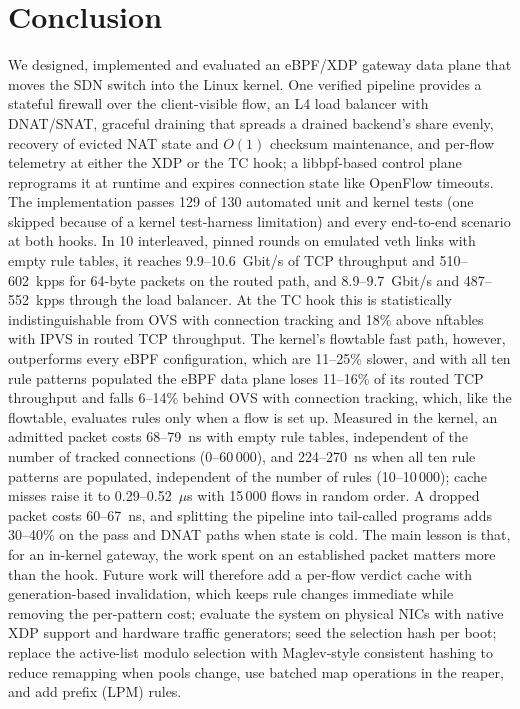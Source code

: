 \documentclass[conference]{IEEEtran}
\begin{document}
\section{Conclusion}
We designed, implemented and evaluated an eBPF/XDP gateway data plane that
moves the SDN switch into the Linux kernel. One verified pipeline provides a
stateful firewall over the client-visible flow, an L4 load balancer with
DNAT/SNAT, graceful draining that spreads a drained backend's share evenly,
recovery of evicted NAT state and $O(1)$ checksum maintenance, and per-flow
telemetry at either the XDP or the TC hook; a libbpf-based control plane
reprograms it at runtime and expires connection state like OpenFlow
timeouts. The implementation passes 129 of 130 automated unit and kernel
tests (one skipped because of a kernel test-harness limitation) and every
end-to-end scenario at both hooks. In 10 interleaved, pinned rounds on
emulated veth links with empty rule tables, it reaches 9.9--10.6~Gbit/s of
TCP throughput and 510--602~kpps for 64-byte packets on the routed path, and
8.9--9.7~Gbit/s and 487--552~kpps through the load balancer. At the TC hook
this is statistically indistinguishable from OVS with connection tracking
and 18\% above nftables with IPVS in routed TCP throughput. The kernel's
flowtable fast path, however, outperforms every eBPF configuration, which
are 11--25\% slower, and with all ten rule patterns populated the eBPF data plane
loses 11--16\% of its routed TCP throughput and falls 6--14\% behind OVS with
connection tracking, which, like the flowtable, evaluates rules only when a
flow is set up. Measured in the kernel, an admitted packet costs 68--79~ns
with empty rule tables, independent of the number of tracked connections
(0--60\,000), and 224--270~ns when all ten rule patterns are populated,
independent of the number of rules (10--10\,000); cache misses raise it to 0.29--0.52~$\mu$s with
15\,000 flows in random order. A dropped packet costs 60--67~ns, and
splitting the pipeline into tail-called programs adds 30--40\% on the pass
and DNAT paths when state is cold. The main lesson is that, for an in-kernel
gateway, the work spent on an established packet matters more than the hook.
Future work will therefore add a per-flow verdict cache with generation-based
invalidation, which keeps rule changes immediate while removing the
per-pattern cost; evaluate the system on physical NICs with native XDP support
and hardware traffic generators; seed the selection hash per boot; replace
the active-list modulo selection with Maglev-style
consistent hashing \cite{eisenbud2016maglev} to reduce remapping when pools
change, use batched map operations in the reaper, and add prefix (LPM) rules.
\end{document}
